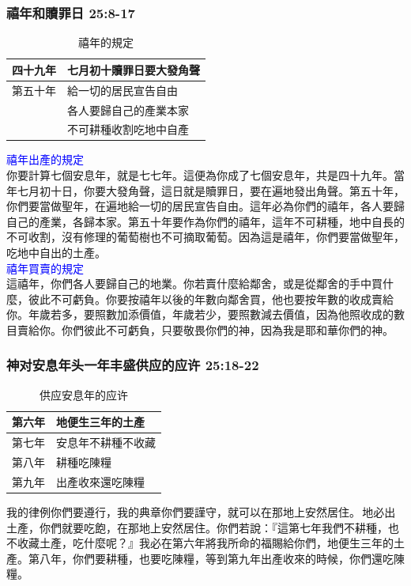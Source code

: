 \subsubsection{禧年和贖罪日 25:8-17}
\begin{table}
\centering
\begin{tabular}{l|l}
\toprule
四十九年&七月初十贖罪日要大發角聲\tabularnewline\hline
第五十年&給一切的居民宣告自由\\
 & 各人要歸自己的產業本家\\
& 不可耕種收割吃地中自產\tabularnewline\hline
\bottomrule
\end{tabular}
\caption{禧年的規定}
\end{table} 
\textcolor{blue}{禧年出產的規定}\\
你要計算七個安息年，就是七七年。這便為你成了七個安息年，共是四十九年。當年七月初十日，你要大發角聲，這日就是贖罪日，要在遍地發出角聲。第五十年，你們要當做聖年，在遍地給一切的居民宣告自由。這年必為你們的禧年，各人要歸自己的產業，各歸本家。第五十年要作為你們的禧年，這年不可耕種，地中自長的不可收割，沒有修理的葡萄樹也不可摘取葡萄。因為這是禧年，你們要當做聖年，吃地中自出的土產。\\
\textcolor{blue}{禧年買賣的規定}\\
這禧年，你們各人要歸自己的地業。你若賣什麼給鄰舍，或是從鄰舍的手中買什麼，彼此不可虧負。你要按禧年以後的年數向鄰舍買，他也要按年數的收成賣給你。年歲若多，要照數加添價值，年歲若少，要照數減去價值，因為他照收成的數目賣給你。你們彼此不可虧負，只要敬畏你們的神，因為我是耶和華你們的神。

\subsubsection{神对安息年头一年丰盛供应的应许 25:18-22}
\begin{table}
\vspace*{-8mm}
\centering
\begin{tabular}{l|l}
\toprule
第六年 &地便生三年的土產 \\\hline
第七年&安息年不耕種不收藏\tabularnewline\hline
第八年&耕種吃陳糧\tabularnewline\hline
第九年&出產收來還吃陳糧\tabularnewline\hline
\bottomrule
\end{tabular}
\caption{供应安息年的应许}
\end{table} 
我的律例你們要遵行，我的典章你們要謹守，就可以在那地上安然居住。 地必出土產，你們就要吃飽，在那地上安然居住。你們若說：『這第七年我們不耕種，也不收藏土產，吃什麼呢？』我必在第六年將我所命的福賜給你們，地便生三年的土產。第八年，你們要耕種，也要吃陳糧，等到第九年出產收來的時候，你們還吃陳糧。

